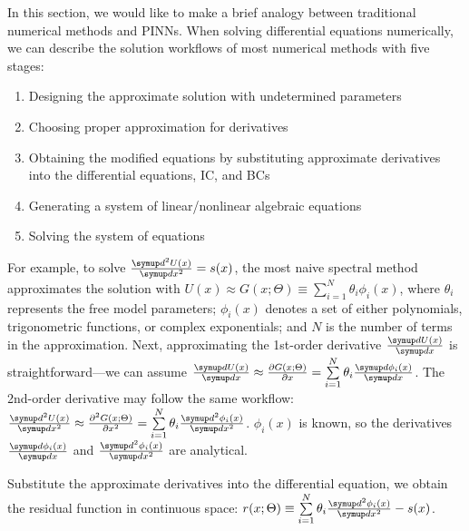 In this section, we would like to make a brief analogy between traditional numerical methods and PINNs.
When solving differential equations numerically, we can describe the solution workflows of most numerical methods with five stages:
\begin{enumerate}[nolistsep]
    \item Designing the approximate solution with undetermined parameters
    \item Choosing proper approximation for derivatives
    \item Obtaining the modified equations by substituting approximate derivatives into the differential equations, IC, and BCs
    \item Generating a system of linear/nonlinear algebraic equations
    \item Solving the system of equations
\end{enumerate}

For example, to solve $\frac{\diff^2 U(x)}{\diff x^2}=s(x)$, the most naive spectral method \cite{trefethen_spectral_2000} approximates the solution with $U(x)\approx G(x; \Theta)\equiv\sum\limits_{i=1}^{N}\theta_i\phi_i(x)$, where $\theta_i$ represents the free model parameters; $\phi_i(x)$ denotes a set of either polynomials, trigonometric functions, or complex exponentials; and $N$ is the number of terms in the approximation.
Next, approximating the 1st-order derivative $\frac{\diff U(x)}{\diff x}$ is straightforward---we can assume $\frac{\diff U(x)}{\diff x} \approx \pdiff{G(x; \Theta)}{x}=\sum\limits_{i=1}^{N}\theta_i \frac{\diff \phi_i(x)}{\diff x}$.
The 2nd-order derivative may follow the same workflow: $\frac{\diff^2 U(x)}{\diff x^2} \approx \frac{\partial^2 G(x; \Theta)}{\partial x^2}=\sum\limits_{i=1}^{N}\theta_i \frac{\diff^2 \phi_i(x)}{\diff x^2}$.
$\phi_i(x)$ is known, so the derivatives $\frac{\diff \phi_i(x)}{\diff x}$ and $\frac{\diff^2 \phi_i(x)}{\diff x^2}$ are analytical.

Substitute the approximate derivatives into the differential equation, we obtain the residual function in continuous space: $r(x; \Theta) \equiv \sum\limits_{i=1}^{N}\theta_i \frac{\diff^2 \phi_i(x)}{\diff x^2} - s(x)$.

